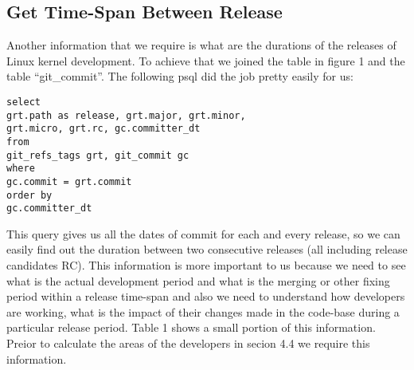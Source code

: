 \documentclass{acm_proc_article-sp}
\begin{document}
\subsection{Get Time-Span Between Release}
Another information that we require is what are the durations of the releases of Linux kernel development. To achieve that we joined the table in figure 1 and the table ``git\_commit''. The following psql did the job pretty easily for us:
\begin{lstlisting}
select
grt.path as release, grt.major, grt.minor,
grt.micro, grt.rc, gc.committer_dt
from
git_refs_tags grt, git_commit gc
where
gc.commit = grt.commit
order by
gc.committer_dt
\end{lstlisting}
This query gives us all the dates of commit for each and every release, so we can easily find out the duration between two consecutive releases (all including release candidates RC). This information is more important to us because we need to see what is the actual development period and what is the merging or other fixing period within a release time-span and also we need to understand how developers are working, what is the impact of their changes made in the code-base during a particular release period. Table 1 shows a small portion of this information. Preior to calculate the areas of the developers in secion 4.4 we require this information.
\end{document}
